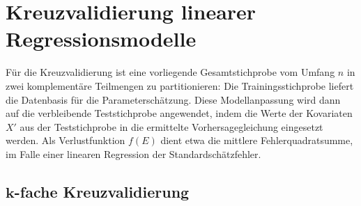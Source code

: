 \section{Kreuzvalidierung linearer Regressionsmodelle}
\label{sec:regrCV}

Für die Kreuzvalidierung ist eine vorliegende Gesamtstichprobe vom Umfang $n$ in zwei komplementäre Teilmengen zu partitionieren: Die Trainingsstichprobe liefert die Datenbasis für die Parameterschätzung. Diese Modellanpassung wird dann auf die verbleibende Teststichprobe angewendet, indem die Werte der Kovariaten $X'$ aus der Teststichprobe in die ermittelte Vorhersagegleichung eingesetzt werden. Als Verlustfunktion $f(E)$ dient etwa die mittlere Fehlerquadratsumme, im Falle einer linearen Regression der Standardschätzfehler.

\subsection[\texorpdfstring{$k$}{k}-fache Kreuzvalidierung]{$\bm{k}$-fache Kreuzvalidierung}
\label{sec:kfoldCV}

